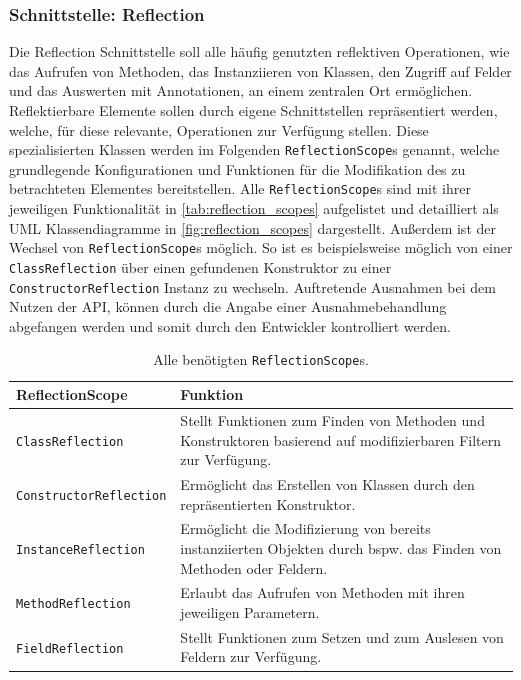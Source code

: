 \subsubsection{Schnittstelle: Reflection}
Die Reflection Schnittstelle soll alle häufig genutzten reflektiven Operationen, wie das Aufrufen von Methoden, das Instanziieren von Klassen, den Zugriff auf Felder und das Auswerten mit Annotationen, an einem zentralen Ort ermöglichen. Reflektierbare Elemente sollen durch eigene Schnittstellen repräsentiert werden, welche, für diese relevante, Operationen zur Verfügung stellen. Diese spezialisierten Klassen werden im Folgenden \texttt{ReflectionScope}s genannt, welche grundlegende Konfigurationen und Funktionen für die Modifikation des zu betrachteten Elementes bereitstellen. Alle \texttt{ReflectionScope}s sind mit ihrer jeweiligen Funktionalität in \autoref{tab:reflection_scopes} aufgelistet und detailliert als UML Klassendiagramme in \autoref{fig:reflection_scopes} dargestellt. Außerdem ist der Wechsel von \texttt{ReflectionScope}s möglich. So ist es beispielsweise möglich von einer \texttt{ClassReflection} über einen gefundenen Konstruktor zu einer \texttt{ConstructorReflection} Instanz zu wechseln. Auftretende Ausnahmen bei dem Nutzen der API, können durch die Angabe einer Ausnahmebehandlung abgefangen werden und somit durch den Entwickler kontrolliert werden.
\begin{table}[H]
	\centering
	\renewcommand*{\arraystretch}{1.3}
	\begin{tabular}{|p{}|p{}|}
		\hline
		ReflectionScope & Funktion\\
		\hline
		\texttt{ClassReflection} & Stellt Funktionen zum Finden von Methoden und Konstruktoren basierend auf modifizierbaren Filtern zur Verfügung.\\
		\hline
		\texttt{ConstructorReflection} & Ermöglicht das Erstellen von Klassen durch den repräsentierten Konstruktor.\\
		\hline
		\texttt{InstanceReflection} & Ermöglicht die Modifizierung von bereits instanziierten Objekten durch bspw. das Finden von Methoden oder Feldern.\\
		\hline
		\texttt{MethodReflection} & Erlaubt das Aufrufen von Methoden mit ihren jeweiligen Parametern.\\
		\hline
		\texttt{FieldReflection} & Stellt Funktionen zum Setzen und zum Auslesen von Feldern zur Verfügung.\\
		\hline
	\end{tabular}
	\caption{Alle benötigten \texttt{ReflectionScope}s.}
	\label{tab:reflection_scopes}
\end{table}
